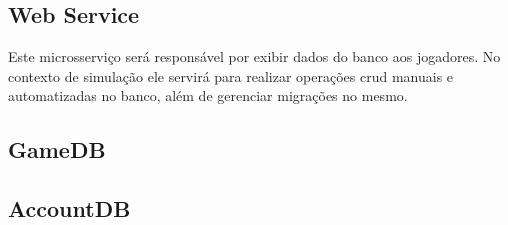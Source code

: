 \subsection{Web Service}

Este microsserviço será responsável por exibir dados do banco aos jogadores.
%
No contexto de simulação ele servirá para realizar operações \ac{crud} manuais e automatizadas no banco, além de gerenciar migrações no mesmo.

\subsection{GameDB}

\subsection{AccountDB}
